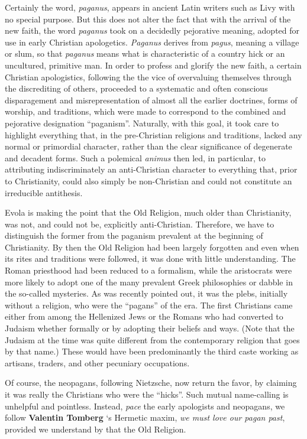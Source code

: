 Certainly the word, \emph{paganus}, appears in ancient Latin writers such as Livy with no special purpose. But this does not alter the fact that with the arrival of the new faith, the word \emph{paganus} took on a decidedly pejorative meaning, adopted for use in early Christian apologetics. \emph{Paganus} derives from \emph{pagus}, meaning a village or slum, so that \emph{paganus} means what is characteristic of a country hick or an uncultured, primitive man. In order to profess and glorify the new faith, a certain Christian apologistics, following the the vice of overvaluing themselves through the discrediting of others, proceeded to a systematic and often conscious disparagement and misrepresentation of almost all the earlier doctrines, forms of worship, and traditions, which were made to correspond to the combined and pejorative designation ``paganism''. Naturally, with this goal, it took care to highlight everything that, in the pre-Christian religions and traditions, lacked any normal or primordial character, rather than the clear significance of degenerate and decadent forms. Such a polemical \emph{animus} then led, in particular, to attributing indiscriminately an anti-Christian character to everything that, prior to Christianity, could also simply be non-Christian and could not constitute an irreducible antithesis.

\begin{quotationx}
Evola is making the point that the Old Religion, much older than Christianity, was not, and could not be, explicitly anti-Christian. Therefore, we have to distinguish the former from the paganism prevalent at the beginning of Christianity. By then the Old Religion had been largely forgotten and even when its rites and traditions were followed, it was done with little understanding. The Roman priesthood had been reduced to a formalism, while the aristocrats were more likely to adopt one of the many prevalent Greek philosophies or dabble in the so-called mysteries. As was recently pointed out, it was the plebs, initially without a religion, who were the ``pagans'' of the era. The first Christians came either from among the Hellenized Jews or the Romans who had converted to Judaism whether formally or by adopting their beliefs and ways. (Note that the Judaism at the time was quite different from the contemporary religion that goes by that name.) These would have been predominantly the third caste working as artisans, traders, and other pecuniary occupations.

Of course, the neopagans, following Nietzsche, now return the favor, by claiming it was really the Christians who were the ``hicks''. Such mutual name-calling is unhelpful and pointless. Instead, \emph{pace} the early apologists and neopagans, we follow \textbf{Valentin Tomberg} `s Hermetic maxim, \emph{we must love our pagan past}, provided we understand by that the Old Religion.
\end{quotationx}

